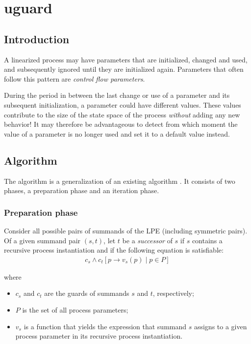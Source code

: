 \chapter{uguard}

\section{Introduction}

A linearized process may have parameters that are initialized, changed and used, and subsequently ignored until they are initialized again.
Parameters that often follow this pattern are \emph{control flow parameters}.

During the period in between the last change or use of a parameter and its subsequent initialization, a parameter could have different values.
These values contribute to the size of the state space of the process \emph{without} adding any new behavior!
It may therefore be advantageous to detect from which moment the value of a parameter is no longer used and set it to a default value instead.

\section{Algorithm}

The algorithm is a generalization of an existing algorithm \cite{van2009state}.
It consists of two phases, a preparation phase and an iteration phase.

\subsection{Preparation phase}

Consider all possible pairs of summands of the LPE (including symmetric pairs).
Of a given summand pair $(s, t)$, let $t$ be a \emph{successor} of $s$ if $s$ contains a recursive process instantiation and if the following equation is satisfiable:
\begin{align*}
c_s \land {c_t}[p \rightarrow v_s(p) \;|\; p \in P]
\end{align*}

where

\begin{itemize}
\item $c_s$ and $c_t$ are the guards of summands $s$ and $t$, respectively;
\item $P$ is the set of all process parameters;
\item $v_s$ is a function that yields the expression that summand $s$ assigns to a given process parameter in its recursive process instantiation.
\end{itemize}

